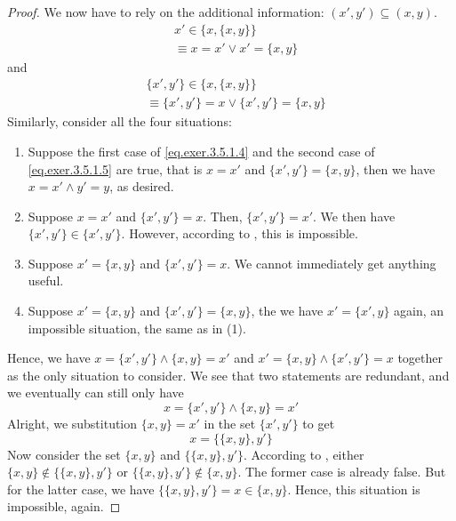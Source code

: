 \begin{proof}
	We now have to rely on the additional information: $(x',y') \subseteq (x,y)$.
	\begin{equation}\label{eq.exer.3.5.1.4}
		\begin{aligned}
			&x' \in \{x, \{x,y\}\} \\
			&\equiv x = x' \vee x' = \{x,y\}
		\end{aligned}
	\end{equation}
	and
	\begin{equation}\label{eq.exer.3.5.1.5}
		\begin{aligned}
			&\{x',y'\} \in \{x, \{x,y\}\} \\
			&\equiv \{x',y'\} = x \vee \{x',y'\} = \{x,y\}
		\end{aligned}
	\end{equation}
	Similarly, consider all the four situations:
	\begin{enumerate}
		\item Suppose the first case of \eqref{eq.exer.3.5.1.4} and the second case of \eqref{eq.exer.3.5.1.5} are true, that is $x = x'$ and $\{x',y'\} = \{x,y\}$, then we have $x = x' \wedge y'=y$, as desired.
		
		\item Suppose $x = x'$ and $\{x',y'\} = x$. Then, $\{x',y'\} = x'$. We then have $\{x',y'\} \in \{x',y'\}$. However, according to , this is impossible.
		
		\item Suppose $x' = \{x,y\}$ and $\{x',y'\} = x$. We cannot immediately get anything useful.
		
		\item Suppose $x' = \{x,y\}$ and $\{x',y'\} = \{x,y\}$, the we have $x' = \{x',y\}$ again, an impossible situation, the same as in (1).
	\end{enumerate}

	Hence, we have $x = \{x',y'\} \wedge \{x,y\} = x'$ and $x' = \{x,y\} \wedge \{x',y'\} = x$ together as the only situation to consider. We see that two statements are redundant, and we eventually can still only have 
	\[
		x = \{x',y'\} \wedge \{x,y\} = x'
	\]
	Alright, we substitution $\{x,y\} = x'$ in the set $\{x',y'\}$ to get
	\[
		x = \{\{x,y\},y'\}
	\]
	Now consider the set $\{x,y\}$ and $\{\{x,y\},y'\}$. According to , either $\{x,y\} \notin \{\{x,y\},y'\}$ or $\{\{x,y\},y'\} \notin \{x,y\}$. The former case is already false. But for the latter case, we have $\{\{x,y\},y'\} = x \in \{x,y\}$. Hence, this situation is impossible, again.


\end{proof}
